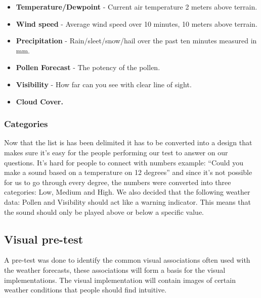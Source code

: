 \begin{itemize}
     \item \textbf{Temperature/Dewpoint} - Current air temperature 2 meters above terrain.
     \item \textbf{Wind speed} - Average wind speed over 10 minutes, 10 meters above terrain.
     \item \textbf{Precipitation} - Rain/sleet/snow/hail over the past ten minutes measured in mm.
     \item \textbf{Pollen Forecast} - The potency of the pollen.
     \item \textbf{Visibility} - How far can you see with clear line of sight.
     \item \textbf{Cloud Cover.}
 \end{itemize}



\subsubsection{Categories} %
\label{ssub:categories}

Now that the list is has been delimited it has to be converted into a design that makes sure it’s easy for the people performing our test to answer on our questions. 
It’s hard for people to connect with numbers example: “Could you make a sound based on a temperature on 12 degrees” and since it’s not possible for us to go through every degree, the numbers were converted into three categories: Low, Medium and High. 
We also decided that the following weather data: Pollen and Visibility should act like a warning indicator. 
This means that the sound should only be played above or below a specific value.



\subsection{Visual pre-test} %
\label{sub:visual_pre_test}

A pre-test was done to identify the common visual associations often used with the weather forecasts, these associations will form a basis for the visual implementations. 
The visual implementation will contain images of certain weather conditions that people should find intuitive.


